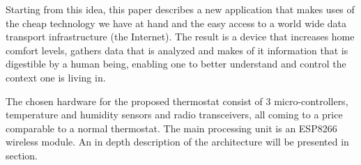 Starting from this idea, this paper describes a new application that makes uses of the cheap technology we
have at hand and the easy access to a world wide data transport infrastructure (the Internet). The result is
a device that increases home comfort levels, gathers data that is analyzed and makes of it information that
is digestible by a human being, enabling one to better understand and control the context one is living in.

The chosen hardware for the proposed thermostat consist of 3 micro-controllers, temperature and humidity sensors
and radio transceivers, all coming to a price comparable to a normal thermostat. The main processing unit
is an ESP8266 wireless module. An in depth description of the architecture will be presented in
section.
